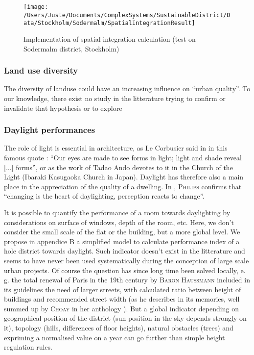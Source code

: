 \documentclass[english]{article}
\newcommand{\noun}[1]{\textsc{#1}}
\begin{document}
\begin{figure}
\hfill{}\texttt{[image: /Users/Juste/Documents/ComplexSystems/SustainableDistrict/Data/Stockholm/Sodermalm/SpatialIntegrationResult]}\hfill{}\caption{Implementation of spatial integration calculation (test on Sodermalm
district, Stockholm)}


\end{figure}



\subsubsection{Land use diversity}

The diversity of landuse could have an increasing influence on ``urban
quality''. To our knowledge, there exist no study in the litterature
trying to confirm or invalidate that hypothesis or to explore


\subsubsection{Daylight performances}

The role of light is essential in architecture, as Le Corbusier said
in \cite{corbusier1924vers} in this famous quote : ``Our eyes are
made to see forms in light; light and shade reveal {[}...{]} forms'',
or as the work of Tadao Ando devotes to it in the Church of the Light
(Ibaraki Kasugaoka Church in Japan). Daylight has therefore also a
main place in the appreciation of the quality of a dwelling. In \cite{phillips19232004},
\noun{Philips} confirms that ``changing is the heart of daylighting,
perception reacts to change''.

\bigskip{}


It is possible to quantify the performance of a room towards daylighting
by considerations on surface of windows, depth of the room, etc. Here,
we don't consider the small scale of the flat or the building, but
a more global level. We propose in appendice B a simplified model
to calculate performance index of a hole district towards daylight.
Such indicator doesn't exist in the litterature and seems to have
never been used systematically during the conception of large scale
urban projects. Of course the question has since long time been solved
locally, e. g. the total renewal of Paris in the 19th century by \noun{Baron
Haussmann }included in its guidelines the need of larger streets,
with calculated ratio between height of buildings and recommended
street width (as he describes in its memories, well summed up by \noun{Choay}
in her anthology \cite{choay1965urbanisme}). But a global indicator
depending on geographical position of the district (sun position in
the sky depends strongly on it), topology (hills, differences of floor
heights), natural obstacles (trees) and expriming a normalised value
on a year can go further than simple height regulation rules.
\end{document}
